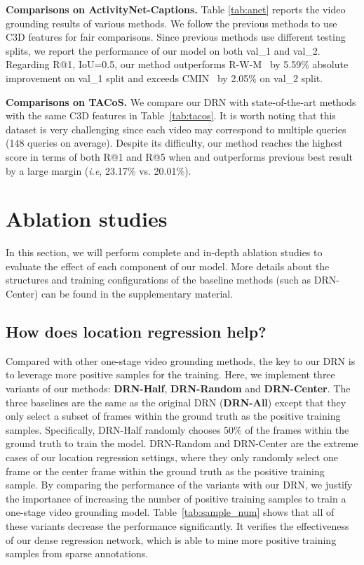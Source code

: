 \documentclass[10pt,twocolumn,letterpaper]{article}
\def\ie{\emph{i.e}\onedot} \def\Ie{\emph{I.e}\onedot}
\begin{document}
	\noindent \textbf{Comparisons on ActivityNet-Captions.} Table \ref{tab:anet} reports the video grounding results of various methods. We follow the previous methods to use C3D features for fair comparisons. Since previous methods use different testing splits, we report the performance of our model on both val\_1 and val\_2.
	Regarding R@1, IoU=0.5, our method outperforms R-W-M~\cite{he2019read} by 5.59\% absolute improvement on val\_1 split and exceeds CMIN~\cite{zhang2019cross} by 2.05\% on val\_2 split.  
	
	\noindent \textbf{Comparisons on TACoS.} We compare our DRN with state-of-the-art methods with the same C3D features in Table~\ref{tab:tacos}. It is worth noting that this dataset is very challenging since each video may correspond to multiple queries (148 queries on average). Despite its difficulty, our method reaches the highest score in terms of both R@1 and R@5 when  and outperforms previous best result by a large margin (\ie, 23.17\% vs. 20.01\%).


	
	\section{Ablation studies}
	\label{sec:ablation}
	
	In this section, we will perform complete and in-depth
	ablation studies to evaluate the effect of each component of our model. More details about the structures and training configurations of the baseline methods (such as DRN-Center) can be found in the supplementary material.
	
	\subsection{How does location regression help?}
	\label{sec:ablation_DRN}
	
	Compared with other one-stage video grounding methods, the key to our DRN is to leverage more positive samples for the training. Here, we implement three variants of our methods: \textbf{DRN-Half}, \textbf{DRN-Random} and \textbf{DRN-Center}. The three baselines are the same as the original DRN (\textbf{DRN-All}) except that they only select a subset of frames within the ground truth as the positive training samples. Specifically, DRN-Half randomly chooses 50\% of the frames within the ground truth to train the model. DRN-Random and DRN-Center are the extreme cases of our location regression settings, where they only randomly select one frame or the center frame within the ground truth as the positive training sample. By comparing the performance of the variants with our DRN, we justify the importance of increasing the number of positive training samples to train a one-stage video grounding model.
	Table~\ref{tab:sample_num} shows that all of these variants decrease the performance significantly. It verifies the effectiveness of our dense regression network, which is able to mine more positive training samples from sparse annotations.
	
\end{document}
